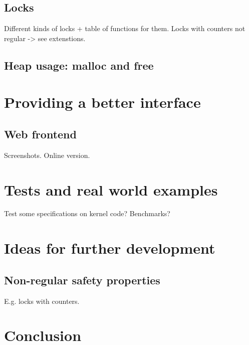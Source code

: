 \section{Locks}
Different kinds of locks + table of functions for them.
Locks with counters not regular -> see extenstions.

\section{Heap usage: malloc and free}


\chapter{Providing a better interface}
\section{Web frontend}
Screenshots.
Online version.


\chapter{Tests and real world examples}
Test some specifications on kernel code?
Benchmarks?


\chapter{Ideas for further development}
\section{Non-regular safety properties}
E.g. locks with counters.


\chapter{Conclusion}

